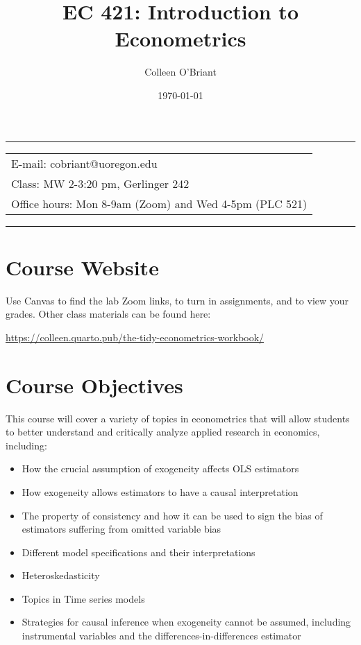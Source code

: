 \documentclass[11pt]{article}
\author{Colleen O'Briant}
\date{\today}
\title{EC 421: Introduction to Econometrics}
\begin{document}
\maketitle
\noindent\rule{\textwidth}{0.5pt}

\begin{center}
\begin{tabular}{l}
E-mail: cobriant@uoregon.edu\\
Class: MW 2-3:20 pm, Gerlinger 242\\
Office hours: Mon 8-9am (Zoom) and Wed 4-5pm  (PLC 521)\\
\end{tabular}
\end{center}

\noindent\rule{\textwidth}{0.5pt}

\section*{Course Website}
\label{sec:orgb956bd0}

Use Canvas to find the lab Zoom links, to turn in assignments, and to view your grades. Other class materials can be found here:

\url{https://colleen.quarto.pub/the-tidy-econometrics-workbook/}

\section*{Course Objectives}
\label{sec:orge4642a0}

This course will cover a variety of topics in econometrics that will allow students to better understand and critically analyze applied research in economics, including:

\begin{itemize}
\item How the crucial assumption of exogeneity affects OLS estimators
\item How exogeneity allows estimators to have a causal interpretation
\item The property of consistency and how it can be used to sign the bias of estimators suffering from omitted variable bias
\item Different model specifications and their interpretations
\item Heteroskedasticity
\item Topics in Time series models
\item Strategies for causal inference when exogeneity cannot be assumed, including instrumental variables and the differences-in-differences estimator
\end{itemize}
\end{document}
